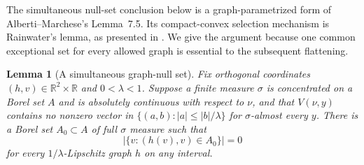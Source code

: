 \documentclass[11pt]{article}
\numberwithin{equation}{section}
\newtheorem{lemma}[theorem]{Lemma}
\theoremstyle{definition}
\theoremstyle{remark}
\newcommand{\R}{\mathbb R}
\begin{document}
The simultaneous null-set conclusion below is a graph-parametrized form of
Alberti--Marchese's Lemma~7.5.  Its compact-convex selection mechanism
is Rainwater's lemma, as presented in
\cite[Lemma~7.1 and Corollary~7.2]{AlbertiMarchese2016}.
We give the argument because one common exceptional set for every
allowed graph is essential to the subsequent flattening.

\begin{lemma}[A simultaneous graph-null set]\label{hp:cone-null}
Fix orthogonal coordinates $(h,v)\in\R^2\times\R$ and
$0<\lambda<1$.  Suppose a finite measure $\sigma$ is concentrated on a
Borel set $A$ and is absolutely continuous with respect to $\nu$,
and that $V(\nu,y)$ contains no nonzero vector in
$\{(a,b):|a|\le |b|/\lambda\}$ for $\sigma$-almost every $y$.
There is a Borel set $A_0\subset A$ of full $\sigma$ measure such that
\begin{equation}\label{hp:graph-null}
 \bigl|\{v:(h(v),v)\in A_0\}\bigr|=0
\end{equation}
for every $1/\lambda$-Lipschitz graph $h$ on any interval.
\end{lemma}
\end{document}
